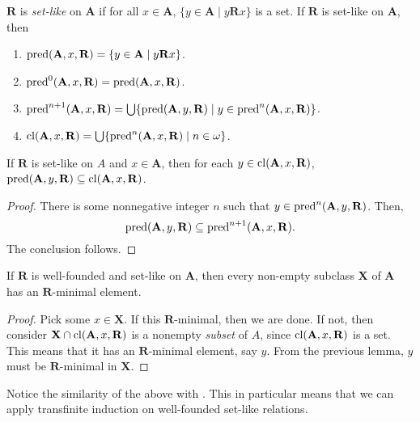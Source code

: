 \begin{definition}
    $\mathbf R$ is \emph{set-like} on $\mathbf A$ if for all $x\in\mathbf A$, $\{y\in \mathbf A\mid y\mathbf R x\}$ is a set. If $\mathbf R$ is set-like on $\mathbf A$, then 
    \begin{enumerate}[label=(\alph*)]
        \item $\operatorname{pred}(\mathbf A, x,\mathbf R) = \{y\in\mathbf A\mid y\mathbf R x\}$. 
        \item $\operatorname{pred}^0(\mathbf A, x,\mathbf R) = \operatorname{pred}(\mathbf A, x, \mathbf R)$. 
        \item $\operatorname{pred}^{n + 1}(\mathbf A, x,\mathbf R) = \bigcup\{\operatorname{pred}(\mathbf A, y, \mathbf R)\mid y\in\operatorname{pred}^n(\mathbf A, x, \mathbf R)\}$. 
        \item $\operatorname{cl}(\mathbf A, x,\mathbf R) = \bigcup\{\operatorname{pred}^n(\mathbf A, x,\mathbf R)\mid n\in\omega\}$.
    \end{enumerate}
\end{definition}

\begin{lemma}
    If $\mathbf R$ is set-like on $A$ and $x\in\mathbf A$, then for each $y\in\operatorname{cl}(\mathbf A, x,\mathbf R)$, $\operatorname{pred}(\mathbf A, y, \mathbf R)\subseteq\operatorname{cl}(\mathbf A, x,\mathbf R)$.
\end{lemma}
\begin{proof}
    There is some nonnegative integer $n$ such that $y\in\operatorname{pred}^n(\mathbf A, y,\mathbf R)$. Then, $$\operatorname{pred}(\mathbf A, y, \mathbf R)\subseteq\operatorname{pred}^{n + 1}(\mathbf A, x,\mathbf R).$$ The conclusion follows.
\end{proof}

\begin{theorem}
    If $\mathbf R$ is well-founded and set-like on $\mathbf A$, then every non-empty subclass $\mathbf X$ of $\mathbf A$ has an $\mathbf R$-minimal element.
\end{theorem}
\begin{proof}
    Pick some $x\in\mathbf X$. If this $\mathbf R$-minimal, then we are done. If not, then consider $\mathbf X\cap\operatorname{cl}(\mathbf A, x,\mathbf R)$ is a nonempty \emph{subset} of $A$, since $\operatorname{cl}(\mathbf A, x, \mathbf R)$ is a set. This means that it has an $\mathbf R$-minimal element, say $y$. From the previous lemma, $y$ must be $\mathbf R$-minimal in $\mathbf X$.
\end{proof}

\begin{remark}
    Notice the similarity of the above with . This in particular means that we can apply transfinite induction on well-founded set-like relations.
\end{remark}

